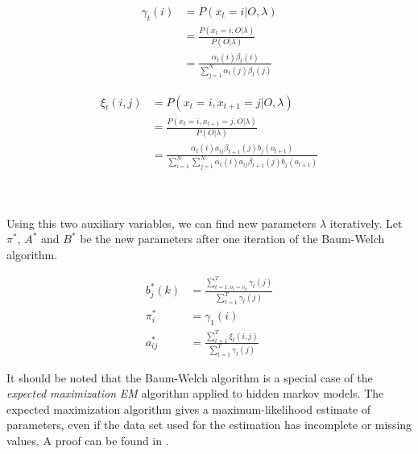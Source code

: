 \begin{minipage}{0.45\textwidth}
	\begin{align*}
	\gamma_t(i) &= P(x_t = i|O,\lambda) \\
	&= \frac{P(x_t = i, O|\lambda)}{P(O|\lambda)} \\
	&=\frac{\alpha_t(i)\beta_t(i)}{\sum_{j = 1}^{N} \alpha_t(j) \beta_t(j)} 
	\end{align*}
\end{minipage}
\hfill
\begin{minipage}{0.45\textwidth}
	\begin{align*}
	\xi_t(i, j) &= P(x_t = i,x_{t + 1} = j|O,\lambda) \\
	&= \frac{P(x_t = i,x_{t + 1} = j, O|\lambda)}{P(O|\lambda)} \\
	&=\frac{\alpha_t(i)a_{ij}\beta_{t + 1}(j)b_j(o_{t + 1})}{\sum_{i = 1}^{N} \sum_{j = 1}^{N} \alpha_t(i)a_{ij}\beta_{t + 1}(j)b_j(o_{t + 1})}
	\end{align*}
\end{minipage}
\\ \\
Using this two auxiliary variables, we can find new parameters $\lambda$ iteratively. Let $\pi^*$, $A^*$ and $B^*$ be the new parameters after one iteration of the Baum-Welch algorithm. 

\begin{align*}
b^*_j(k) &= \frac{\sum_{t = 1, o_t = v_k}^{T} \gamma_t(j)}{\sum_{t = 1}^{T} \gamma_t(j)} \\
\pi^*_i &= \gamma_1(i) \\
a_{ij}^*  &= \frac{\sum_{t = 1}^{T} \xi_t(i, j)}{\sum_{t = 1}^{T} \gamma_t(j)} 
\end{align*}

It should be noted that the Baum-Welch algorithm is a special case of the \textit{expected maximization} {\textit{EM}} algorithm applied to hidden markov models. The expected maximization algorithm gives a maximum-likelihood estimate of parameters, even if the data set used for the estimation has incomplete or missing values. A proof can be found in \cite{bilmes1998gentle}. 